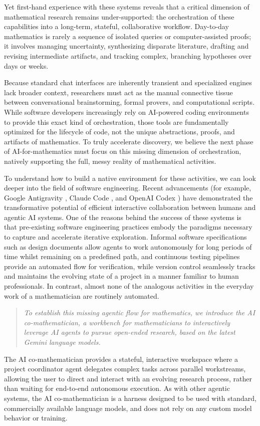 \documentclass[11pt, a4paper, copyright, gdm]{google}
\begin{document}
Yet first-hand experience with these systems reveals that a critical dimension of mathematical research remains under-supported: the orchestration of these capabilities into a long-term, stateful, collaborative workflow.
Day-to-day mathematics is rarely a sequence of isolated queries or computer-assisted proofs; it involves managing uncertainty, synthesizing disparate literature, drafting and revising intermediate artifacts, and tracking complex, branching hypotheses over days or weeks. 

Because standard chat interfaces are inherently transient and specialized engines lack broader context, researchers must act as the manual connective tissue between conversational brainstorming, formal provers, and computational scripts.
While software developers increasingly rely on AI-powered coding environments to provide this exact kind of orchestration, those tools are fundamentally optimized for the lifecycle of code, not the unique abstractions, proofs, and artifacts of mathematics.
To truly accelerate discovery, we believe the next phase of AI-for-mathematics must focus on this missing dimension of orchestration, natively supporting the full, messy reality of mathematical activities.

To understand how to build a native environment for these activities, we can look deeper into the field of software engineering.
Recent advancements (for example, Google Antigravity \citep{google2025antigravity}, Claude Code \citep{anthropic2025claudecode}, and OpenAI Codex \citep{openai2025codex}) have demonstrated the transformative potential of efficient interactive collaboration between humans and agentic AI systems.
One of the reasons behind the success of these systems is that pre-existing software engineering practices embody the paradigms necessary to capture and accelerate iterative exploration.
Informal software specifications such as design documents allow agents to work autonomously for long periods of time whilst remaining on a predefined path, and continuous testing pipelines provide an automated flow for verification, while version control seamlessly tracks and maintains the evolving state of a project in a manner familiar to human professionals.
In contrast, almost none of the analogous activities in the everyday work of a mathematician are routinely automated.

\begin{quote}\em
    To establish this missing agentic flow for mathematics, we introduce the AI co-mathematician, a workbench for mathematicians to interactively leverage AI agents to pursue open-ended research, based on the latest Gemini language models.
\end{quote}
The AI co-mathematician provides a stateful, interactive workspace where a project coordinator agent delegates complex tasks across parallel workstreams, allowing the user to direct and interact with an evolving research process, rather than waiting for end-to-end autonomous execution.
As with other agentic systems, the AI co-mathematician is a harness designed to be used with standard, commercially available language models, and does not rely on any custom model behavior or training.
\end{document}
